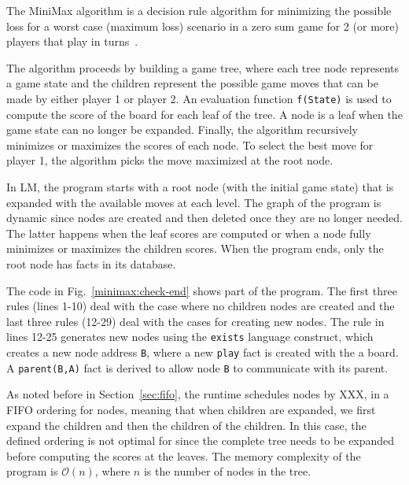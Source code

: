 The MiniMax algorithm is a decision rule algorithm for minimizing the
possible loss for a worst case (maximum loss) scenario in a zero sum
game for 2 (or more) players that play in
turns~\cite{Edwards54}.

The algorithm proceeds by building a game tree, where each tree node represents a
game state and the children represent the possible game moves that can
be made by either player 1 or player 2.
An evaluation function \texttt{f(State)} is used to compute the score of
the board for each leaf of the tree. A node is a leaf when the game state can no longer be
expanded. Finally, the
algorithm recursively minimizes or maximizes the scores of each node.
To select the best move for player 1, the
algorithm picks the move maximized at the root node.

In LM, the program starts with a root node (with the initial game state)
that is expanded with the available moves at each level. The graph of the
program is dynamic since nodes are created and then deleted once they are no
longer needed. The latter happens when the
leaf scores are computed or when a node fully minimizes or maximizes the
children scores. When the program ends, only the root node has facts in its
database.

The code in Fig.~\ref{minimax:check-end} shows part of the program.
The first three rules (lines 1-10) deal
with the case where no children nodes are created and the last three rules
(12-29) deal with the cases for creating new nodes.
The rule in lines 12-25 generates new nodes using the
\texttt{exists} language construct, which creates a new node address
\texttt{B}, where a new \texttt{play} fact is created with the a
board. A \texttt{parent(B,A)} fact is derived to allow node \texttt{B} to
communicate with its parent.

As noted before in Section~\ref{sec:fifo}, the runtime schedules nodes by XXX,
in a FIFO ordering for nodes,
meaning that when children are expanded, we first expand the children and
then the children of the children. In this case, the defined ordering
is not optimal for since the complete tree needs
to be expanded before computing the scores at the leaves. The memory
complexity of the program is $\mathcal{O}(n)$, where $n$ is the number of nodes
in the tree.

